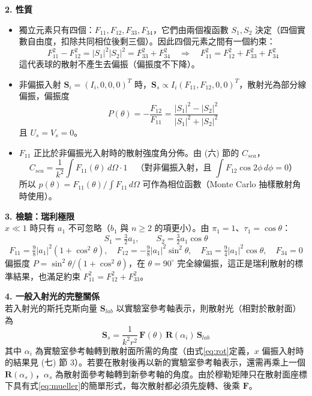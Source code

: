\textbf{2. 性質}\\
\begin{itemize}
    \item[(1)] {獨立元素只有四個：$F_{11}, F_{12}, F_{33}, F_{34}$，它們由兩個複函數 $S_1, S_2$ 決定（四個實數自由度，扣除共同相位後剩三個）。因此四個元素之間有一個約束：
        \begin{equation}
            F_{11}^2 - F_{12}^2 = |S_1|^2 |S_2|^2 = F_{33}^2 + F_{34}^2 \quad \Rightarrow \quad F_{11}^2 = F_{12}^2 + F_{33}^2 + F_{34}^2
        \end{equation}
        這代表球的散射不產生去偏振（偏振度不下降）。}
    \item[(2)] {非偏振入射 $\mathbf{S}_i = (I_i, 0, 0, 0)^{T}$ 時，$\mathbf{S}_s \propto I_i (F_{11}, F_{12}, 0, 0)^{T}$，散射光為部分線偏振，偏振度
        \begin{equation}
            P(\theta) = -\frac{F_{12}}{F_{11}} = \frac{|S_1|^2 - |S_2|^2}{|S_1|^2 + |S_2|^2}
        \end{equation}
        且 $U_s = V_s = 0$。}
    \item[(3)] {$F_{11}$ 正比於非偏振光入射時的散射強度角分佈。由 (六) 節的 $C_{sca}$，
        \begin{equation}
            C_{sca} = \frac{1}{k^2} \int F_{11}(\theta)\, d\Omega \cdot 1 \quad \text{（對非偏振入射，且 $\int F_{12} \cos 2\phi\, d\phi = 0$）}
        \end{equation}
        所以 $p(\theta) = F_{11}(\theta) \big/ \int F_{11}\, d\Omega$ 可作為相位函數（Monte Carlo 抽樣散射角時使用）。}
\end{itemize}

\textbf{3. 檢驗：瑞利極限}\\
$x \ll 1$ 時只有 $a_1$ 不可忽略（$b_1$ 與 $n \geq 2$ 的項更小）。由 $\pi_1 = 1$、$\tau_1 = \cos\theta$：
\begin{equation}
    S_1 = \tfrac{3}{2} a_1, \qquad S_2 = \tfrac{3}{2} a_1 \cos\theta
\end{equation}
\begin{equation}
    F_{11} = \tfrac{9}{8} |a_1|^2 \left( 1 + \cos^2\theta \right), \quad F_{12} = -\tfrac{9}{8} |a_1|^2 \sin^2\theta, \quad F_{33} = \tfrac{9}{4} |a_1|^2 \cos\theta, \quad F_{34} = 0
\end{equation}
偏振度 $P = \sin^2\theta / (1 + \cos^2\theta)$，在 $\theta = 90^\circ$ 完全線偏振，這正是瑞利散射的標準結果，也滿足約束 $F_{11}^2 = F_{12}^2 + F_{33}^2$。

\textbf{4. 一般入射光的完整關係}\\
若入射光的斯托克斯向量 $\mathbf{S}_{lab}$ 以實驗室參考軸表示，則散射光（相對於散射面）為
\begin{equation}
    \mathbf{S}_s = \frac{1}{k^2 r^2}\, \mathbf{F}(\theta)\, \mathbf{R}(\alpha_i)\, \mathbf{S}_{lab}
\end{equation}
其中 $\alpha_i$ 為實驗室參考軸轉到散射面所需的角度（由式\eqref{eq:rot}定義，$x$ 偏振入射時的結果見 (七) 節 3）。若要在散射後再以新的實驗室參考軸表示，還需再乘上一個 $\mathbf{R}(\alpha_s)$，$\alpha_s$ 為散射面參考軸轉到新參考軸的角度。由於穆勒矩陣只在散射面座標下具有式\eqref{eq:mueller}的簡單形式，每次散射都必須先旋轉、後乘 $\mathbf{F}$。